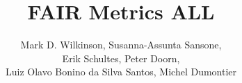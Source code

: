 \documentclass[english]{article}
\begin{document}
\title{FAIR Metrics ALL}

\author{Mark D. Wilkinson, Susanna-Assunta Sansone, \\Erik Schultes, Peter Doorn,\\ 
Luiz Olavo Bonino da Silva Santos, Michel Dumontier}

\maketitle

\newpage


\thispagestyle{fancy}


\centering
\end{document}
